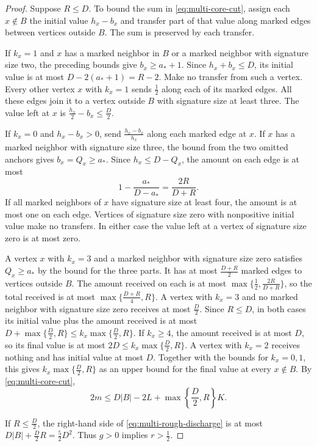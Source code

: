 \documentclass[preprint,11pt,numbers]{elsarticle-arxiv}
\numberwithin{equation}{section}
\theoremstyle{definition}
\begin{document}
\begin{proof}
Suppose $R\leq D$. To bound the sum in \eqref{eq:multi-core-cut},
assign each $x\notin B$ the initial value $h_x-b_x$ and transfer
part of that value along marked edges between vertices outside $B$.
The sum is preserved by each transfer.

If $k_x=1$ and $x$ has a marked neighbor in $B$ or a marked neighbor
with signature size two, the preceding bounds give $b_x\geq a_*+1$.
Since $h_x+b_x\leq D$, its initial value is at most
$D-2(a_*+1)=R-2$. Make no transfer from such a vertex. Every other
vertex $x$ with $k_x=1$ sends $\frac12$ along each of its marked
edges. All these edges join it to a vertex outside $B$ with
signature size at least three. The value left at $x$ is
$\frac{h_x}{2}-b_x\leq\frac D2$.

If $k_x=0$ and $h_x-b_x>0$, send
$\frac{h_x-b_x}{h_x}$ along each marked edge at $x$.
If $x$ has a marked neighbor with signature size three, the bound
from the two omitted anchors gives $b_x=Q_x\geq a_*$. Since
$h_x\leq D-Q_x$, the amount on each edge is at most
\[
 1-\frac{a_*}{D-a_*}=\frac{2R}{D+R}.
\]
If all marked neighbors of $x$ have signature size at least four,
the amount is at most one on each edge. Vertices of signature size
zero with nonpositive initial value make no transfers. In either
case the value left at a vertex of signature size zero is at most
zero.

A vertex $x$ with $k_x=3$ and a marked neighbor with signature
size zero satisfies $Q_x\geq a_*$ by the bound for the three
parts. It has at most $\frac{D+R}{2}$ marked edges to vertices
outside $B$. The amount received on each is at most
$\max\{\frac12,\frac{2R}{D+R}\}$, so the total received is at
most $\max\{\frac{D+R}{4},R\}$. A vertex with $k_x=3$ and no
marked neighbor with signature size zero receives at most
$\frac D2$. Since $R\leq D$, in both cases its initial value
plus the amount received is at most
$D+\max\{\frac D2,R\}\leq k_x\max\{\frac D2,R\}$.
If $k_x\geq4$, the amount received is at most $D$, so its
final value is at most $2D\leq k_x\max\{\frac D2,R\}$.
A vertex with $k_x=2$ receives nothing and has initial value
at most $D$. Together with the bounds for $k_x=0,1$, this
gives $k_x\max\{\frac D2,R\}$ as an upper bound for the final
value at every $x\notin B$. By \eqref{eq:multi-core-cut},
\begin{equation}\label{eq:multi-rough-discharge}
2m\le D|B|-2L+\max\left\{\frac{D}{2},R\right\}K.
\end{equation}

If $R\le \frac{D}{2}$, the right-hand side of \eqref{eq:multi-rough-discharge}
is at most $D|B|+\frac{D}{2}R=\frac{5}{2}D^2$.
Thus $g>0$ implies $r>\frac{1}{2}$.


\end{proof}
\end{document}
